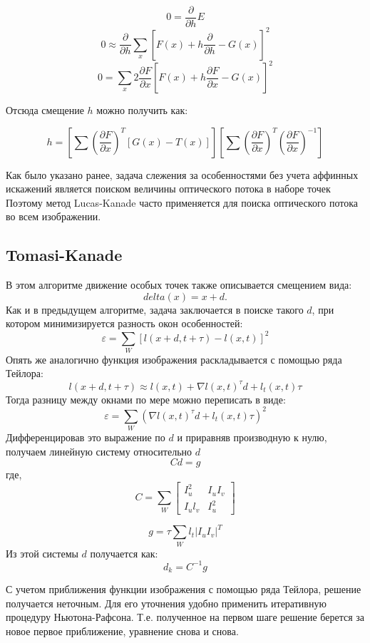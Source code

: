 \[0=\frac{\partial}{\partial h} E\]
\[0 \approx \frac{\partial}{\partial h} \sum_x[F(x)+h\frac{\partial}{\partial h}-G(x)]^2\]
\[0 =\sum_x 2\frac{\partial F}{\partial x} [F(x)+h\frac{\partial F}{\partial x}-G(x)]^2\]

Отсюда смещение $h$ можно получить как:

\[h = \left[\sum(\frac{\partial F}{\partial x})^T[G(x)-T(x)]\right] \left[\sum(\frac{\partial F}{\partial x})^T(\frac{\partial F}{\partial x})^{-1}\right]\]

Как было указано ранее, задача слежения за особенностями без учета аффинных искажений является поиском величины оптического потока в наборе точек Поэтому метод Lucas-Kanade часто применяется для поиска оптического потока во всем изображении.

\subsection{Tomasi-Kanade}
В этом алгоритме движение особых точек также описывается смещением вида:
\[delta(x) = x + d.\]
Как и в предыдущем алгоритме, задача заключается в поиске такого $d$, при котором минимизируется разность окон особенностей:
\begin{equation}
\varepsilon =\sum_W \left[l(x+d,t+\tau)-l(x,t) \right]^2
\end{equation}
Опять же аналогично функция изображения раскладывается с помощью ряда Тейлора:
\begin{equation}
l(x+d,t+\tau) \approx l(x,t) + \nabla l(x,t)^\tau d+l_t(x,t)\tau
\end{equation}
Тогда разницу между окнами по мере можно переписать в виде:
\begin{equation}
\varepsilon =\sum_W \left( \nabla l(x,t)^\tau d+l_t(x,t)\tau \right)^2
\end{equation}
Дифференцировав это выражение по $d$ и приравняв производную к нулю, получаем линейную систему относительно $d$
$$Cd=g$$
где,$$C = \sum_W \begin{bmatrix}
I_u^2 & I_uI_v\\
I_ul_v & I_u^2
\end{bmatrix}$$

$$g=\tau\sum_W l_t \left | I_uI_v \right |^T$$
Из этой системы $d$ получается как:
$$d_k=C^{-1}g$$

С учетом приближения функции изображения с помощью ряда Тейлора, решение получается неточным. Для его уточнения удобно применить итеративную процедуру Ньютона-Рафсона. Т.е. полученное на первом шаге решение берется за новое первое приближение, уравнение снова и снова.


